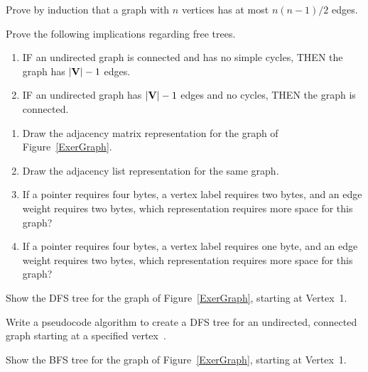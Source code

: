 \begin{exercises}

\item
Prove by induction that a graph with \(n\) vertices has
at most \(n(n-1)/2\) edges.

\item
Prove the following implications regarding free trees.

\begin{enumerate}
\item IF an undirected graph is connected and has no simple cycles,
THEN the graph has \(|{\textbf{V}}| - 1\) edges.

\item IF an undirected graph has \(|{\textbf{V}}| - 1\) edges and no
cycles, THEN the graph is connected.
\end{enumerate}

\item
\begin{enumerate}

\item
Draw the adjacency matrix representation for
the graph of Figure~\ref{ExerGraph}.

\item
Draw the adjacency list representation for
the same graph.

\item
If a pointer requires four bytes, a vertex label requires two bytes,
and an edge weight requires two bytes, which representation requires
more space for this graph?

\item
If a pointer requires four bytes, a vertex label requires one byte,
and an edge weight requires two bytes, which representation requires
more space for this graph?
\end{enumerate}

\item
Show the DFS tree for
the graph of Figure~\ref{ExerGraph}, starting at Vertex~1.

\item
Write a pseudocode algorithm to create a DFS tree for an undirected,
connected graph starting at a specified vertex~.

\item
Show the BFS tree for
the graph of Figure~\ref{ExerGraph}, starting at Vertex~1.


\end{exercises}

